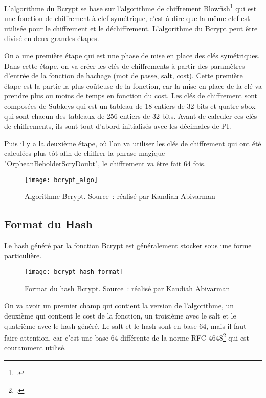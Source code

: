 L'algorithme du Bcrypt se base sur l'algorithme de chiffrement Blowfish\footcite{noauthor_blowfish_2019} qui est une fonction de chiffrement à clef symétrique, c'est-à-dire que la même clef est utilisée pour le chiffrement et le déchiffrement. 
L'algorithme du Bcrypt peut être divisé en deux grandes étapes.

On a une première étape qui est une phase de mise en place des clés symétriques. 
Dans cette étape, on va créer les clés de chiffrements à partir des paramètres d'entrée de la fonction de hachage (mot de passe, salt, cost). 
Cette première étape est la partie la plus coûteuse de la fonction, car la mise en place de la clé va prendre plus ou moins de temps en fonction du cost. 
Les clés de chiffrement sont composées de Subkeys qui est un tableau de 18 entiers de 32 bits et quatre \gls{sbox} qui sont chacun des tableaux de 256 entiers de 32 bits. 
Avant de calculer ces clés de chiffrements, ils sont tout d'abord initialisés avec les décimales de PI.

Puis il y a la deuxième étape, où l'on va utiliser les clés de chiffrement qui ont été calculées plus tôt afin de chiffrer la phrase magique "OrpheanBeholderScryDoubt", le chiffrement va être fait 64 fois.

\begin{figure}[tbph!]
	\centering
	\texttt{[image: bcrypt\_algo]}
	\caption[Algorithme Bcrypt]{Algorithme Bcrypt. Source : réalisé par Kandiah Abivarman}
	\label{fig:bcrypt_algo}
\end{figure}

\newpage

\subsection{Format du Hash}

Le hash généré par la fonction Bcrypt est généralement stocker sous une forme particulière. 

\begin{figure}[tbph!]
	\centering
	\texttt{[image: bcrypt\_hash\_format]}
	\caption[Format du hash Bcrypt]{Format du hash Bcrypt. Source : réalisé par Kandiah Abivarman}
	\label{fig:bcrypt_hash_format}
\end{figure}

On va avoir un premier champ qui contient la version de l'algorithme, un deuxième qui contient le cost de la fonction, un troisième avec le salt et le quatrième avec le hash généré. 
Le salt et le hash sont en base 64, mais il faut faire attention, car c'est une base 64 différente de la norme RFC 4648\footcite{josefsson_base16_2006} qui est couramment utilisé.

